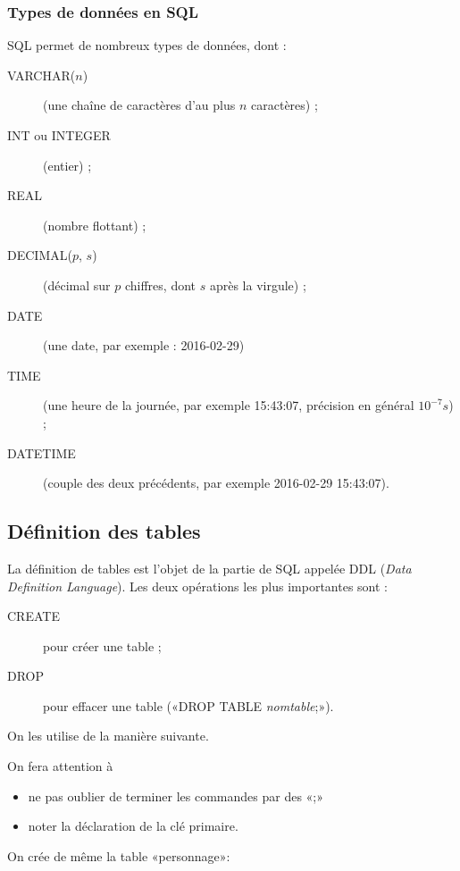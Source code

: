 \subsubsection{Types de données en SQL}
SQL permet de nombreux types de données, dont :
\begin{description}
\item[VARCHAR($n$)] (une chaîne de caractères d'au plus $n$ caractères) ;
\item[INT ou INTEGER] (entier) ;
\item[REAL] (nombre flottant) ;
\item[DECIMAL($p$, $s$)] (décimal sur $p$ chiffres, dont $s$ après la virgule) ;
\item[DATE] (une date, par exemple : 2016-02-29)
\item[TIME] (une heure de la journée, par exemple 15:43:07, précision en
  général $10^{-7} s$) ;
\item[DATETIME] (couple des deux précédents, par exemple 2016-02-29 15:43:07).
\end{description}


\subsection{Définition des tables}

La définition de tables est l'objet de la partie de SQL appelée DDL (\emph{Data Definition
Language}). Les deux opérations les plus importantes sont :
\begin{description}
\item[CREATE] pour créer une table ;
\item[DROP] pour effacer une table («DROP TABLE \emph{nomtable};»).
\end{description}

On les utilise de la manière suivante.





On fera attention à 
\begin{itemize}
\item ne pas oublier de terminer les commandes par des «;»
\item noter la déclaration de la clé primaire.
\end{itemize}


On crée de même la table «personnage»:




